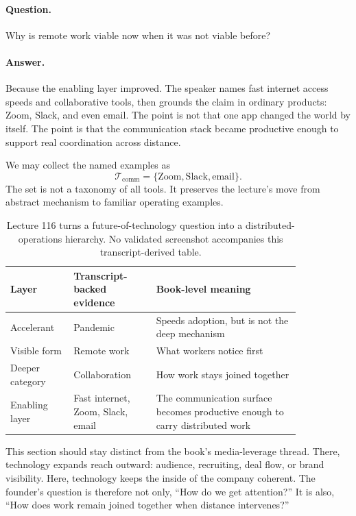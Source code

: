 \documentclass[11pt,oneside]{book}
\begin{document}
\paragraph{Question.}
Why is remote work viable now when it was not viable before?

\paragraph{Answer.}
Because the enabling layer improved. The speaker names fast internet access speeds and collaborative tools, then grounds the claim in ordinary products: Zoom, Slack, and even email. The point is not that one app changed the world by itself. The point is that the communication stack became productive enough to support real coordination across distance.

We may collect the named examples as
\[
\mathcal{T}_{\mathrm{comm}}
=
\{\mathrm{Zoom},\mathrm{Slack},\mathrm{email}\}.
\]
The set is not a taxonomy of all tools. It preserves the lecture's move from abstract mechanism to familiar operating examples.

\begin{table}
\centering
\small
\begin{tabular}{p{0.18\linewidth}p{0.24\linewidth}p{0.42\linewidth}}
\hline
Layer & Transcript-backed evidence & Book-level meaning \\
\hline
Accelerant & Pandemic & Speeds adoption, but is not the deep mechanism \\
Visible form & Remote work & What workers notice first \\
Deeper category & Collaboration & How work stays joined together \\
Enabling layer & Fast internet, Zoom, Slack, email & The communication surface becomes productive enough to carry distributed work \\
\hline
\end{tabular}
\caption{Lecture 116 turns a future-of-technology question into a distributed-operations hierarchy. No validated screenshot accompanies this transcript-derived table.}
\end{table}

This section should stay distinct from the book's media-leverage thread. There, technology expands reach outward: audience, recruiting, deal flow, or brand visibility. Here, technology keeps the inside of the company coherent. The founder's question is therefore not only, ``How do we get attention?'' It is also, ``How does work remain joined together when distance intervenes?''
\end{document}
